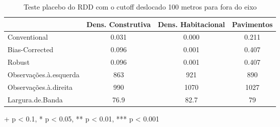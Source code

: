 \begin{table}[h]
  \centering
\caption{Teste placebo do RDD com o cutoff deslocado 100 metros para fora do eixo} 
\fontsize{10pt}{12pt}\selectfont
\begin{tabular*}{.85\linewidth}{@{\extracolsep{\fill}}lccc}
\toprule
  & Dens. Construtiva & Dens. Habitacional & Pavimentos \\ 
\midrule\addlinespace[2.5pt]
Conventional & 0.031 & 0.000 & 0.211 \\ 
Bias-Corrected & 0.096 & 0.001 & 0.407 \\ 
{Robust} & {0.096} & {0.001} & {0.407} \\ 
\midrule
Observações.à.esquerda & 863 & 921 & 890 \\ 
Observações.à.direita & 990 & 1070 & 1027 \\ 
Largura.de.Banda & 76.9 & 82.7 & 79 \\ 
\bottomrule
\end{tabular*}
\begin{minipage}{.85\linewidth}
+ p < 0.1, * p < 0.05, ** p < 0.01, *** p < 0.001\\
\end{minipage}
\end{table}

